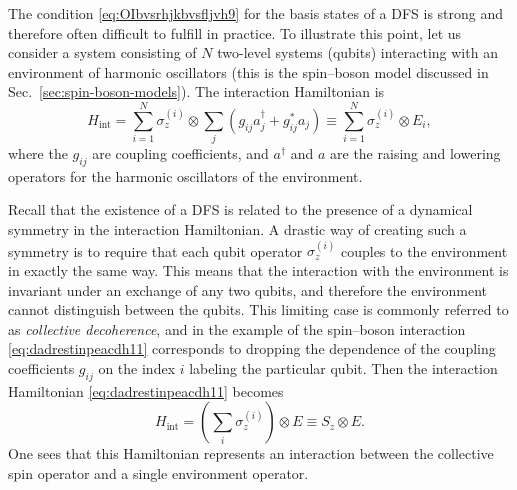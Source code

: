 \documentclass[3p,sort&compress,12pt]{elsarticle}
\newcommand{\op}[1]{#1}
\begin{document}
The condition \eqref{eq:OIbvsrhjkbvsfljvh9} for the basis states of a DFS is strong and therefore often difficult to fulfill in practice. To illustrate this point, let us consider a system consisting of $N$ two-level systems (qubits) interacting with an environment of harmonic oscillators (this is the spin--boson model discussed in Sec.~\ref{sec:spin-boson-models}). The interaction Hamiltonian is
%
\begin{equation}
  \label{eq:dadrestinpeacdh11}
  \op{H}_\text{int} =  \sum_{i=1}^N  \sigma_z^{(i)} \otimes \sum_j
  \left( g_{ij}a_j^\dagger + g_{ij}^* a_j \right) \equiv
  \sum_{i=1}^N  \sigma_z^{(i)} \otimes E_i,
\end{equation}
%  
where the $g_{ij}$ are coupling coefficients, and $a^\dagger$ and $a$ are the raising and lowering operators for the harmonic oscillators of the environment. 

Recall that the existence of a DFS is related to the presence of a dynamical symmetry in the interaction Hamiltonian. A drastic way of creating such a symmetry is to require that each qubit operator $\op{\sigma}_z^{(i)}$ couples to the environment in exactly the same way. This means that the interaction with the environment is invariant under an exchange of any two qubits, and therefore the environment cannot distinguish between the qubits. This limiting case is commonly referred to as \emph{collective decoherence}, and in the example of the spin--boson interaction \eqref{eq:dadrestinpeacdh11} corresponds to dropping the dependence of the coupling coefficients $g_{ij}$ on the index $i$ labeling the particular qubit. Then the interaction Hamiltonian \eqref{eq:dadrestinpeacdh11} becomes 
%
\begin{equation}
\label{eq:dadrestinpeacfxndh22}
\op{H}_\text{int} =  \left( \sum_{i} \sigma_z^{(i)} \right)
\otimes E \equiv
\op{S}_z \otimes E.
\end{equation}
%
One sees that this Hamiltonian represents an interaction between the collective spin operator and a single environment operator. 
\end{document}
